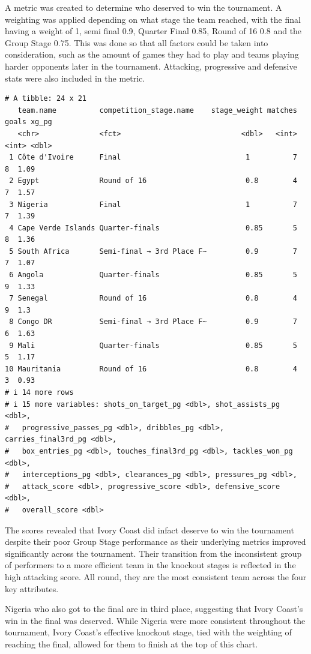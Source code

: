 \documentclass[
  11pt,
  letterpaper,
  DIV=11,
  numbers=noendperiod]{scrartcl}
\begin{document}
A metric was created to determine who deserved to win the tournament. A
weighting was applied depending on what stage the team reached, with the
final having a weight of 1, semi final 0.9, Quarter Final 0.85, Round of
16 0.8 and the Group Stage 0.75. This was done so that all factors could
be taken into consideration, such as the amount of games they had to
play and teams playing harder opponents later in the tournament.
Attacking, progressive and defensive stats were also included in the
metric.

\begin{verbatim}
# A tibble: 24 x 21
   team.name          competition_stage.name    stage_weight matches goals xg_pg
   <chr>              <fct>                            <dbl>   <int> <int> <dbl>
 1 Côte d'Ivoire      Final                             1          7     8  1.09
 2 Egypt              Round of 16                       0.8        4     7  1.57
 3 Nigeria            Final                             1          7     7  1.39
 4 Cape Verde Islands Quarter-finals                    0.85       5     8  1.36
 5 South Africa       Semi-final → 3rd Place F~         0.9        7     7  1.07
 6 Angola             Quarter-finals                    0.85       5     9  1.33
 7 Senegal            Round of 16                       0.8        4     9  1.3 
 8 Congo DR           Semi-final → 3rd Place F~         0.9        7     6  1.63
 9 Mali               Quarter-finals                    0.85       5     5  1.17
10 Mauritania         Round of 16                       0.8        4     3  0.93
# i 14 more rows
# i 15 more variables: shots_on_target_pg <dbl>, shot_assists_pg <dbl>,
#   progressive_passes_pg <dbl>, dribbles_pg <dbl>, carries_final3rd_pg <dbl>,
#   box_entries_pg <dbl>, touches_final3rd_pg <dbl>, tackles_won_pg <dbl>,
#   interceptions_pg <dbl>, clearances_pg <dbl>, pressures_pg <dbl>,
#   attack_score <dbl>, progressive_score <dbl>, defensive_score <dbl>,
#   overall_score <dbl>
\end{verbatim}

The scores revealed that Ivory Coast did infact deserve to win the
tournament despite their poor Group Stage performance as their
underlying metrics improved significantly across the tournament. Their
transition from the inconsistent group of performers to a more efficient
team in the knockout stages is reflected in the high attacking score.
All round, they are the most consistent team across the four key
attributes.

Nigeria who also got to the final are in third place, suggesting that
Ivory Coast's win in the final was deserved. While Nigeria were more
consistent throughout the tournament, Ivory Coast's effective knockout
stage, tied with the weighting of reaching the final, allowed for them
to finish at the top of this chart.
\end{document}
